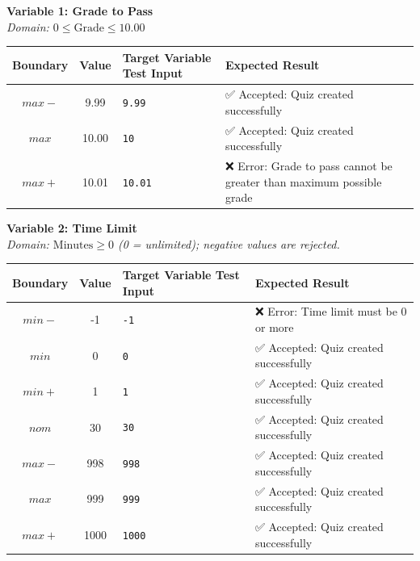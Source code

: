 \documentclass[twoside,final]{hcmut-report}
\begin{document}
\vspace{0.3cm}
\noindent\textbf{Variable 1: Grade to Pass} \\
\textit{Domain: $0 \le \text{Grade} \le 10.00$}
\begin{table}[H]
\centering
\renewcommand{\arraystretch}{1.2}
\begin{tabularx}{\textwidth}{|c|c|l|X|}
\hline
\textbf{Boundary} & \textbf{Value} & \textbf{Target Variable Test Input} & \textbf{Expected Result} \\ \hline
$max-$ & 9.99 & \texttt{9.99} & ✅ Accepted: Quiz created successfully \\ \hline
$max$ & 10.00 & \texttt{10} & ✅ Accepted: Quiz created successfully \\ \hline
$max+$ & 10.01 & \texttt{10.01} & ❌ Error: Grade to pass cannot be greater than maximum possible grade \\ \hline
\end{tabularx}
\end{table}

\vspace{0.3cm}
\noindent\textbf{Variable 2: Time Limit} \\
\textit{Domain: $\text{Minutes} \ge 0$ (0 = unlimited); negative values are rejected.}
\begin{table}[H]
\centering
\renewcommand{\arraystretch}{1.2}
\begin{tabularx}{\textwidth}{|c|c|l|X|}
\hline
\textbf{Boundary} & \textbf{Value} & \textbf{Target Variable Test Input} & \textbf{Expected Result} \\ \hline
$min-$ & -1 & \texttt{-1} & ❌ Error: Time limit must be 0 or more \\ \hline
$min$ & 0 & \texttt{0} & ✅ Accepted: Quiz created successfully \\ \hline
$min+$ & 1 & \texttt{1} & ✅ Accepted: Quiz created successfully \\ \hline
$nom$ & 30 & \texttt{30} & ✅ Accepted: Quiz created successfully \\ \hline
$max-$ & 998 & \texttt{998} & ✅ Accepted: Quiz created successfully \\ \hline
$max$ & 999 & \texttt{999} & ✅ Accepted: Quiz created successfully \\ \hline
$max+$ & 1000 & \texttt{1000} & ✅ Accepted: Quiz created successfully \\ \hline
\end{tabularx}
\end{table}
\end{document}
